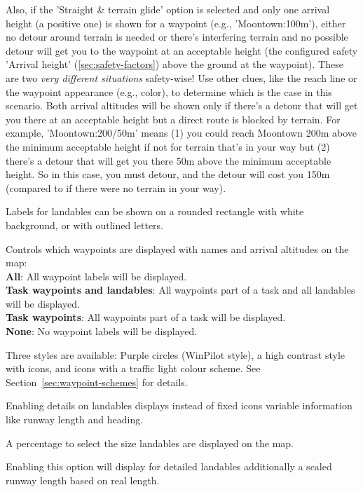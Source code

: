 \begin{description}
  \warning
  Also, if the 'Straight \& terrain glide' option is selected and only one
  arrival height (a positive one) is shown for a waypoint (e.g.,
  'Moontown:100m'), either no detour around terrain is needed or there's
  interfering terrain and no possible detour will get you to the waypoint at
  an acceptable height (the configured safety 'Arrival height'
  (\ref{sec:safety-factors}) above the ground at the waypoint). These are two
  \emph{very different situations} safety-wise!
  Use other clues, like the reach line or the waypoint
  appearance (e.g., color), to determine which is the case in this scenario.
  Both arrival altitudes will be shown only if there's a detour that
  will get you there at an acceptable height but a direct route is blocked
  by terrain.
  For example, 'Moontown:200/50m' means (1) you could reach Moontown 200m above the
  minimum acceptable height if not for terrain that's in your way but (2) there's a detour
  that will get you there 50m above the minimum acceptable height. So in this case,
  you must detour, and the detour will cost you 150m (compared to if there were
  no terrain in your way).

\item[Label style*]  Labels for landables can be shown on a rounded rectangle with 
  white background, or with outlined letters.
\item[Waypoint label visibility*]  \label{conf:labelvisibility} Controls which waypoints 
  are displayed with names and arrival altitudes on the map: \\
  {\bf All}: All waypoint labels will be displayed. \\
  {\bf Task waypoints and landables}: All waypoints part of a task and all landables 
  will be displayed. \\
  {\bf Task waypoints}: All waypoints part of a task will be displayed. \\
  {\bf None}:  No waypoint labels will be displayed.
\item[Landable symbols]  \label{conf:waypointicons} Three styles are available:
  Purple circles (WinPilot style), a high contrast style with icons,
  and icons with a traffic light colour scheme. See Section~\ref{sec:waypoint-schemes} for details.
\item[Detailed landables*]  Enabling details on landables displays instead of fixed icons 
  variable information like runway length and heading.
\item[Landable size*]  A percentage to select the size landables are displayed on the map.
\item[Scale runway length*]  Enabling this option will display for detailed landables 
  additionally a scaled runway length based on real length.
\end{description}


